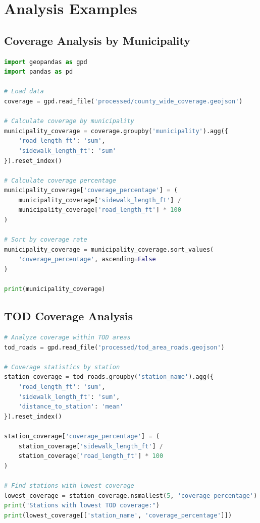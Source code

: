 \documentclass[11pt,letterpaper]{article}
\begin{document}
\section{Analysis Examples}

\subsection{Coverage Analysis by Municipality}

\begin{lstlisting}[language=python]
import geopandas as gpd
import pandas as pd

# Load data
coverage = gpd.read_file('processed/county_wide_coverage.geojson')

# Calculate coverage by municipality
municipality_coverage = coverage.groupby('municipality').agg({
    'road_length_ft': 'sum',
    'sidewalk_length_ft': 'sum'
}).reset_index()

# Calculate coverage percentage
municipality_coverage['coverage_percentage'] = (
    municipality_coverage['sidewalk_length_ft'] /
    municipality_coverage['road_length_ft'] * 100
)

# Sort by coverage rate
municipality_coverage = municipality_coverage.sort_values(
    'coverage_percentage', ascending=False
)

print(municipality_coverage)
\end{lstlisting}

\subsection{TOD Coverage Analysis}

\begin{lstlisting}[language=python]
# Analyze coverage within TOD areas
tod_roads = gpd.read_file('processed/tod_area_roads.geojson')

# Coverage statistics by station
station_coverage = tod_roads.groupby('station_name').agg({
    'road_length_ft': 'sum',
    'sidewalk_length_ft': 'sum',
    'distance_to_station': 'mean'
}).reset_index()

station_coverage['coverage_percentage'] = (
    station_coverage['sidewalk_length_ft'] /
    station_coverage['road_length_ft'] * 100
)

# Find stations with lowest coverage
lowest_coverage = station_coverage.nsmallest(5, 'coverage_percentage')
print("Stations with lowest TOD coverage:")
print(lowest_coverage[['station_name', 'coverage_percentage']])
\end{lstlisting}
\end{document}
